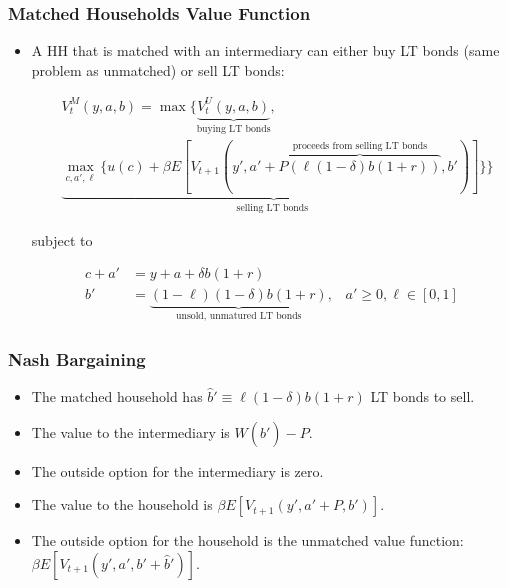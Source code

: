 \documentclass[handout]{beamer}
\begin{document}
\begin{frame}
\frametitle{Matched Households Value Function}

\begin{itemize}[<+->]

\item A HH that is matched with an intermediary can either buy LT bonds (same problem as unmatched) or sell LT bonds:

\begin{align*}
&V_{t}^M(y, a, b) 
= \max
\Bigg\{ 
\underbrace{ V_t^U(y, a, b)}_{\text{buying LT bonds}},\\&\underbrace{ \max_{c, a', \ell} 
\Bigg\{ u(c) + \beta E[V_{t+1}(y', a'+\overbrace{P(\ell (1-\delta)b(1+r))}^{\text{proceeds from selling LT bonds}}, b')] \Bigg\}}_{\text{selling LT bonds }} \Bigg\}
\end{align*}

subject to

\begin{align*}
c + a' &= y + a + \delta b (1 + r)\\
b' &= \underbrace{(1-\ell)(1-\delta)b(1+r)}_{\text{unsold, unmatured LT bonds}}, \; \; \; a' \ge 0, \ell \in [0, 1]
\end{align*}

\end{itemize}

\end{frame}









\begin{frame}
\frametitle{Nash Bargaining}

\begin{itemize}[<+->]

\item The matched household has $\hat{b}' \equiv \ell(1-\delta)b(1+r)$ LT bonds to sell.

\bigskip

\item The value to the intermediary is $W(\hat{b}') - P$.

\bigskip

\item The outside option for the intermediary is zero. 

\bigskip

\item The value to the household is $\beta E[V_{t+1}(y', a' + P, b')]$.

\bigskip

\item The outside option for the household is the unmatched value function: $\beta E[V_{t+1}(y', a', b' + \hat{b}')]$.

\end{itemize}

\end{frame}
\end{document}

